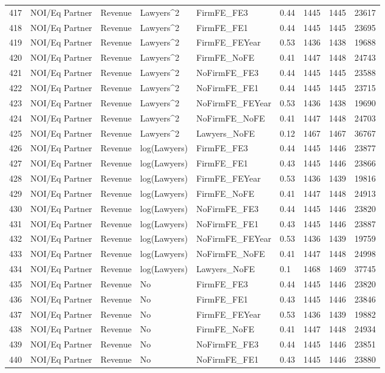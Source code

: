 \begin{table}[ht]
\begin{tabular}{rllllllll}
  417 & NOI/Eq Partner & Revenue & Lawyers^2 & FirmFE\_FE3 & 0.44 & 1445 & 1445 & 23617 \\ 
  418 & NOI/Eq Partner & Revenue & Lawyers^2 & FirmFE\_FE1 & 0.44 & 1445 & 1445 & 23695 \\ 
  419 & NOI/Eq Partner & Revenue & Lawyers^2 & FirmFE\_FEYear & 0.53 & 1436 & 1438 & 19688 \\ 
  420 & NOI/Eq Partner & Revenue & Lawyers^2 & FirmFE\_NoFE & 0.41 & 1447 & 1448 & 24743 \\ 
  421 & NOI/Eq Partner & Revenue & Lawyers^2 & NoFirmFE\_FE3 & 0.44 & 1445 & 1445 & 23588 \\ 
  422 & NOI/Eq Partner & Revenue & Lawyers^2 & NoFirmFE\_FE1 & 0.44 & 1445 & 1445 & 23715 \\ 
  423 & NOI/Eq Partner & Revenue & Lawyers^2 & NoFirmFE\_FEYear & 0.53 & 1436 & 1438 & 19690 \\ 
  424 & NOI/Eq Partner & Revenue & Lawyers^2 & NoFirmFE\_NoFE & 0.41 & 1447 & 1448 & 24703 \\ 
  425 & NOI/Eq Partner & Revenue & Lawyers^2 & Lawyers\_NoFE & 0.12 & 1467 & 1467 & 36767 \\ 
  426 & NOI/Eq Partner & Revenue & log(Lawyers) & FirmFE\_FE3 & 0.44 & 1445 & 1446 & 23877 \\ 
  427 & NOI/Eq Partner & Revenue & log(Lawyers) & FirmFE\_FE1 & 0.43 & 1445 & 1446 & 23866 \\ 
  428 & NOI/Eq Partner & Revenue & log(Lawyers) & FirmFE\_FEYear & 0.53 & 1436 & 1439 & 19816 \\ 
  429 & NOI/Eq Partner & Revenue & log(Lawyers) & FirmFE\_NoFE & 0.41 & 1447 & 1448 & 24913 \\ 
  430 & NOI/Eq Partner & Revenue & log(Lawyers) & NoFirmFE\_FE3 & 0.44 & 1445 & 1446 & 23820 \\ 
  431 & NOI/Eq Partner & Revenue & log(Lawyers) & NoFirmFE\_FE1 & 0.43 & 1445 & 1446 & 23887 \\ 
  432 & NOI/Eq Partner & Revenue & log(Lawyers) & NoFirmFE\_FEYear & 0.53 & 1436 & 1439 & 19759 \\ 
  433 & NOI/Eq Partner & Revenue & log(Lawyers) & NoFirmFE\_NoFE & 0.41 & 1447 & 1448 & 24998 \\ 
  434 & NOI/Eq Partner & Revenue & log(Lawyers) & Lawyers\_NoFE & 0.1 & 1468 & 1469 & 37745 \\ 
  435 & NOI/Eq Partner & Revenue & No & FirmFE\_FE3 & 0.44 & 1445 & 1446 & 23820 \\ 
  436 & NOI/Eq Partner & Revenue & No & FirmFE\_FE1 & 0.43 & 1445 & 1446 & 23846 \\ 
  437 & NOI/Eq Partner & Revenue & No & FirmFE\_FEYear & 0.53 & 1436 & 1439 & 19882 \\ 
  438 & NOI/Eq Partner & Revenue & No & FirmFE\_NoFE & 0.41 & 1447 & 1448 & 24934 \\ 
  439 & NOI/Eq Partner & Revenue & No & NoFirmFE\_FE3 & 0.44 & 1445 & 1446 & 23851 \\ 
  440 & NOI/Eq Partner & Revenue & No & NoFirmFE\_FE1 & 0.43 & 1445 & 1446 & 23880 \\ 
   \hline
\end{tabular}
\end{table}
